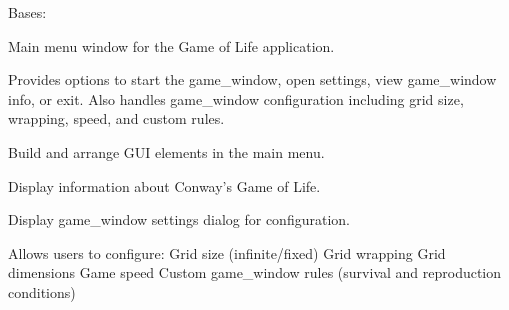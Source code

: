 \documentclass[letterpaper,10pt,oneside,english]{sphinxhowto}
\begin{document}
\begin{fulllineitems}
\label{\detokenize{gui:gui.start_menu.MainMenu}}
\pysigstartsignatures
\pysigline
{}
\pysigstopsignatures
\sphinxAtStartPar
Bases: 

\sphinxAtStartPar
Main menu window for the Game of Life application.

\sphinxAtStartPar
Provides options to start the game\_window, open settings, view game\_window info, or exit.
Also handles game\_window configuration including grid size, wrapping, speed, and custom rules.

\begin{fulllineitems}
\label{\detokenize{gui:gui.start_menu.MainMenu._build_ui}}
\pysigstartsignatures
\pysiglinewithargsret
{}
{}
{}
\pysigstopsignatures
\sphinxAtStartPar
Build and arrange GUI elements in the main menu.

\end{fulllineitems}


\begin{fulllineitems}
\label{\detokenize{gui:gui.start_menu.MainMenu.show_info}}
\pysigstartsignatures
\pysiglinewithargsret
{}
{}
{}
\pysigstopsignatures
\sphinxAtStartPar
Display information about Conway’s Game of Life.

\end{fulllineitems}


\begin{fulllineitems}
\label{\detokenize{gui:gui.start_menu.MainMenu.show_settings}}
\pysigstartsignatures
\pysiglinewithargsret
{}
{}
{}
\pysigstopsignatures
\sphinxAtStartPar
Display game\_window settings dialog for configuration.

\sphinxAtStartPar
Allows users to configure:
\sphinxhyphen{} Grid size (infinite/fixed)
\sphinxhyphen{} Grid wrapping
\sphinxhyphen{} Grid dimensions
\sphinxhyphen{} Game speed
\sphinxhyphen{} Custom game\_window rules (survival and reproduction conditions)


\end{fulllineitems}
\end{fulllineitems}
\end{document}
